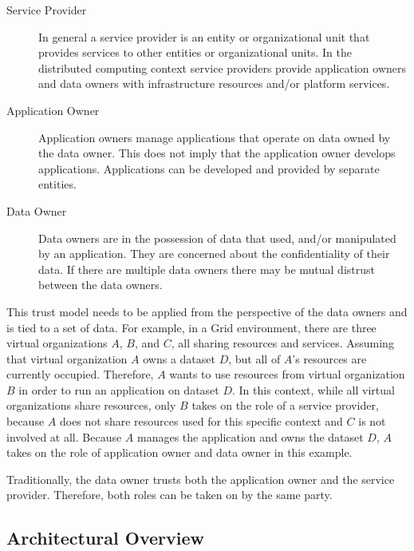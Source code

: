 \begin{description}
  \item[Service Provider]
    In general a service provider is an entity or organizational unit that
    provides services to other entities or organizational units. In the
    distributed computing context service providers provide application owners
    and data owners with infrastructure resources and/or platform services.

  \item[Application Owner]
    Application owners manage applications that operate on data owned by the
    data owner. This does not imply that the application owner develops
    applications. Applications can be developed and provided by separate
    entities.

  \item[Data Owner]
    Data owners are in the possession of data that used, and/or manipulated by
    an application. They are concerned about the confidentiality of their data.
    If there are multiple data owners there may be mutual distrust between the
    data owners.
\end{description}

This trust model needs to be applied from the perspective of the data owners and
is tied to a set of data. For example, in a Grid environment, there are three
virtual organizations $A$, $B$, and $C$, all sharing resources and services.
Assuming that virtual organization $A$ owns a dataset $D$, but all of $A$'s
resources are currently occupied. Therefore, $A$ wants to use resources from
virtual organization $B$ in order to run an application on dataset $D$. In this
context, while all virtual organizations share resources, only $B$ takes on the
role of a service provider, because $A$ does not share resources used for this
specific context and $C$ is not involved at all. Because $A$ manages the
application and owns the dataset $D$, $A$ takes on the role of application owner
and data owner in this example.

Traditionally, the data owner trusts both the application owner and the service
provider. Therefore, both roles can be taken on by the same party.

\subsection{Architectural Overview}

